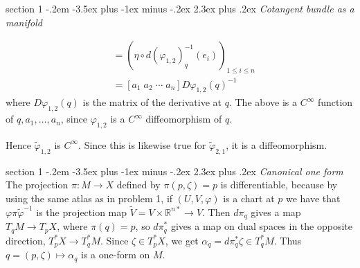 \documentclass[12pt]{article}
\makeatletter
\theoremstyle{norm}
\newcommand{\R}[0]{\mathbb{R}}
\newcommand{\al}[0]{\alpha}
\newcommand{\ph}[0]{\varphi}
\newcommand{\pa}[1]{\left( {#1} \right)}
\newcommand{\pd}[2]{\frac{\partial #1}{\partial #2}}
\newcommand{\iy}[0]{\infty}
\newenvironment{problem}{\@startsection
       {section}
       {1}
       {-.2em}
       {-3.5ex plus -1ex minus -.2ex}
       {2.3ex plus .2ex}
       {\pagebreak[3]%
       \large\bf\noindent{Problem }
       }
       }
       {%
       }
\makeatother
\begin{document}
\begin{problem}{\it Cotangent bundle as a manifold}
\begin{enumerate}
\begin{align*}
&=\pa{\eta \circ d(\ph_{1,2})_{q}^{-1}(e_i)}_{1\le i\le n}\\
&=[a_1\;a_2\;\cdots\;a_n]D\ph_{1,2}(q)^{-1}
\end{align*}
where $D\ph_{1,2}(q)$ is the matrix of the derivative at $q$. The above 
is a $C^{\iy}$ function of $q, a_1,\ldots, a_n$, since $\ph_{1,2}$ %
is a $C^{\iy}$ diffeomorphism of $q$.

Hence $\tilde{\ph}_{1,2}$ is $C^{\iy}$. Since this is likewise true for $\tilde{\ph}_{2,1}$, it is a diffeomorphism.
\end{enumerate}
\end{problem}
\begin{problem}{\it Canonical one form}
The projection $\pi:M\to X$ defined by $\pi(p,\zeta)=p$ is differentiable, because by using the same atlas as in problem 1, if $(U,V,\ph)$ is a chart at $p$ we have that $\ph\pi\tilde{\ph}^{-1}$ is the projection map $\tilde{V}=V\times \R^{n*}\to V$. Then $d\pi_q$ gives a map $T_qM\to T_pX$, where $\pi(q)=p$, so $d\pi_q^*$ gives a map on dual spaces in the opposite direction, $T_p^*X\to T_q^*M$. Since $\zeta\in T_p^*X$, we get $\al_q=d\pi_q^*\zeta\in T_q^*M$. Thus $q=(p,\zeta)\mapsto \al_q$ is a one-form on $M$.
\end{problem}
\end{document}
